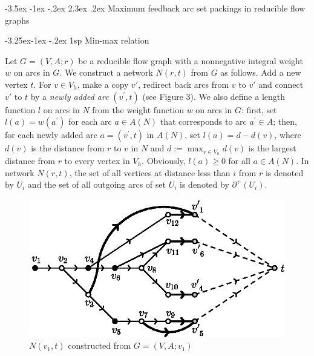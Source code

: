 \documentclass[11pt]{article}
\makeatletter
\renewcommand\section{%
  \@startsection{section}{1}
                {\z@}%
                {-3.5ex \@plus -1ex \@minus -.2ex}%
                {2.3ex \@plus.2ex}%
                {\large\bfseries}%
}
\renewcommand\subsection{%
  \@startsection{subsection}{2}
                {\z@}%
                {-3.25ex\@plus -1ex \@minus -.2ex}%
                {1sp}%
                {\normalsize\bfseries}%
}
\makeatother
\begin{document}
\section{Maximum feedback arc set packings in reducible flow graphs}
\label{sec:3}

\subsection{Min-max relation}
\label{sec:4}

Let $G=(V,A;r)$ be a reducible flow graph with a nonnegative integral weight $w$ on arcs in $G$. We construct a network $N(r,t)$ from $G$ as follows. Add a new vertex $t$. For $v\in V_h$, make a copy $v'$, redirect back arcs from $v$ to $v'$ and connect $v'$ to $t$ by a \emph{newly added arc} $(v^\prime,t)$ (see Figure 3).
We also define a length function $l$ on arcs in $N$ from the weight function $w$ on arcs in $G$: first, set $l(a)=w(a^\prime)$ for each arc $a\in A(N)$ that corresponds to arc $a^\prime\in A$; then, for each newly added arc $a=(v^\prime,t)$ in $A(N)$, set $l(a)=d-d(v)$, where $d(v)$ is the distance from $r$ to $v$ in $N$ and $d:=\max_{v\in V_h} d(v)$ is the largest distance from $r$ to every vertex in $V_h$. Obviously, $l(a)\geq 0$ for all $a\in A(N)$. In network $N(r,t)$, the set of all vertices at distance less than $i$ from $r$ is denoted by $U_i$ and the set of all outgoing arcs of set $U_i$ is denoted by $\partial^+(U_i)$.

\begin{figure}
    \centering
    \includegraphics[scale=0.8]{FASPacking-fig3.eps}
    \caption{$N(v_1,t)$ constructed from $G=(V,A;v_1)$}
     \label{fig:3}
 \end{figure}
\end{document}
